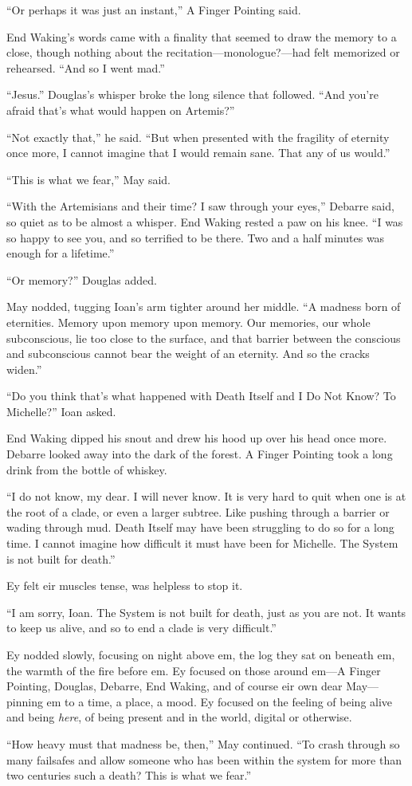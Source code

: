 ``Or perhaps it was just an instant,'' A Finger Pointing said.

End Waking's words came with a finality that seemed to draw the memory to a close, though nothing about the recitation—monologue?—had felt memorized or rehearsed. ``And so I went mad.''

``Jesus.'' Douglas's whisper broke the long silence that followed. ``And you're afraid that's what would happen on Artemis?''

``Not exactly that,'' he said. ``But when presented with the fragility of eternity once more, I cannot imagine that I would remain sane. That any of us would.''

``This is what we fear,'' May said.

``With the Artemisians and their time? I saw through your eyes,'' Debarre said, so quiet as to be almost a whisper. End Waking rested a paw on his knee. ``I was so happy to see you, and so terrified to be there. Two and a half minutes was enough for a lifetime.''

``Or memory?'' Douglas added.

May nodded, tugging Ioan's arm tighter around her middle. ``A madness born of eternities. Memory upon memory upon memory. Our memories, our whole subconscious, lie too close to the surface, and that barrier between the conscious and subconscious cannot bear the weight of an eternity. And so the cracks widen.''

``Do you think that's what happened with Death Itself and I Do Not Know? To Michelle?'' Ioan asked.

End Waking dipped his snout and drew his hood up over his head once more. Debarre looked away into the dark of the forest. A Finger Pointing took a long drink from the bottle of whiskey.

``I do not know, my dear. I will never know. It is very hard to quit when one is at the root of a clade, or even a larger subtree. Like pushing through a barrier or wading through mud. Death Itself may have been struggling to do so for a long time. I cannot imagine how difficult it must have been for Michelle. The System is not built for death.''

Ey felt eir muscles tense, was helpless to stop it.

``I am sorry, Ioan. The System is not built for death, just as you are not. It wants to keep us alive, and so to end a clade is very difficult.''

Ey nodded slowly, focusing on night above em, the log they sat on beneath em, the warmth of the fire before em. Ey focused on those around em—A Finger Pointing, Douglas, Debarre, End Waking, and of course eir own dear May—pinning em to a time, a place, a mood. Ey focused on the feeling of being alive and being \emph{here}, of being present and in the world, digital or otherwise.

``How heavy must that madness be, then,'' May continued. ``To crash through so many failsafes and allow someone who has been within the system for more than two centuries such a death? This is what we fear.''
